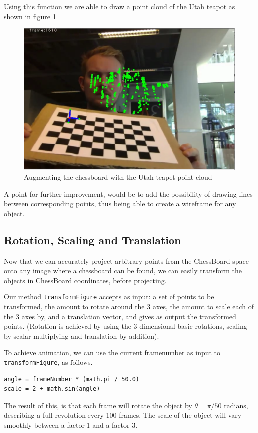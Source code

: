 \documentclass[a4paper,11pt]{article}
\begin{document}
Using this function we are able to draw a point cloud of the Utah teapot as shown in figure \ref{fig:teapot}
\begin{figure}[H]
\centering
\includegraphics[width=0.6\linewidth]{teapot}
\caption{Augmenting the chessboard with the Utah teapot point cloud}
\label{fig:teapot}
\end{figure}

A point for further improvement, would be to add the possibility of drawing lines between corresponding points, thus being able to create a wireframe for any object.
\subsection{Rotation, Scaling and Translation}
Now that we can accurately project arbitrary points from the ChessBoard space onto any image where a chessboard can be found, we can easily transform the objects in ChessBoard coordinates, before projecting.

Our method \texttt{transformFigure} accepts as input: a set of points to be transformed, the amount to rotate around the 3 axes, the amount to scale each of the 3 axes by, and a translation vector, and gives as output the transformed points. (Rotation is achieved by using the 3-dimensional basic rotations, scaling by scalar multiplying and translation by addition).

To achieve animation, we can use the current framenumber as input to \texttt{transformFigure}, as follows.

\begin{lstlisting}
angle = frameNumber * (math.pi / 50.0)
scale = 2 + math.sin(angle)
\end{lstlisting}

The result of this, is that each frame will rotate the object by $\theta = \pi / 50$ radians, describing a full revolution every 100 frames. The scale of the object will vary smoothly between a factor 1 and a factor 3.
\end{document}

